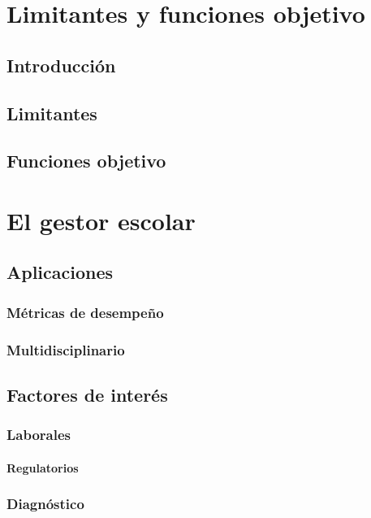 \documentclass[draft,12pt,headsepline,footsepline,paper=letter]{scrreprt}
\begin{document}
\chapter{Limitantes y funciones objetivo}

\section{Introducción}

\section{Limitantes}

\section{Funciones objetivo}

\chapter{El gestor escolar}

\section{Aplicaciones}

\subsection{Métricas de desempeño}

\subsection{Multidisciplinario}

\section{Factores de interés}

\subsection{Laborales}

\subsubsection{Regulatorios}

\subsection{Diagnóstico}
\end{document}
